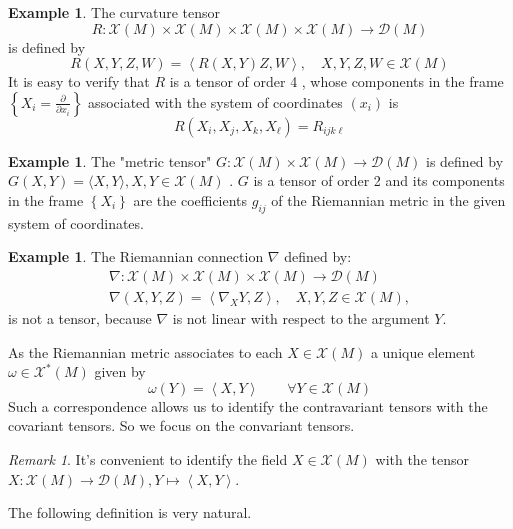 \documentclass{amsart}
\theoremstyle{plain}
\theoremstyle{definition}
\newtheorem{example}[theorem]{Example}
\theoremstyle{remark}
\newtheorem{remark}[theorem]{Remark}
\begin{document}
\begin{example}
The curvature tensor
\[
R: \mathcal{X}(M) \times \mathcal{X}(M) \times \mathcal{X}(M) \times \mathcal{X}(M) \rightarrow \mathcal{D}(M)
\]is defined by
\[
R(X, Y, Z, W)=\left< R(X, Y) Z, W\right>, \quad X, Y, Z, W \in \mathcal{X}(M)
\]It is easy to verify that $R$ is a tensor of order 4 , whose components in the frame $\left\{X_i=\frac{\partial}{\partial x_i}\right\}$ associated with the system of coordinates $\left(x_i\right)$ is
\[
R\left(X_i, X_j, X_k, X_{\ell}\right)=R_{i j k \ell}
\]
\end{example}
\begin{example}
The "metric tensor" $G: \mathcal{X}(M) \times \mathcal{X}(M) \rightarrow \mathcal{D}(M)$ is defined by $G (X, Y)=\langle X, Y\rangle, X, Y \in \mathcal{X}(M)$ .
$G$ is a tensor of order 2 and its components in the frame $\left\{X_i\right\}$ are the coefficients $g_{i j}$ of the Riemannian metric in the given system of coordinates.
\end{example}
\begin{example}
The Riemannian connection $\nabla$ defined by:
\[
\begin{gathered}
\nabla: \mathcal{X}(M) \times \mathcal{X}(M) \times \mathcal{X}(M) \rightarrow \mathcal{D}(M) \\
\nabla(X, Y, Z)=\left<\nabla_X Y, Z\right>, \quad X, Y, Z \in \mathcal{X}(M),
\end{gathered}
\]is not a tensor, because $\nabla$ is not linear with respect to the argument $Y$.
\end{example}
As the Riemannian metric associates to each $X\in \mathcal{X}(M)$ a unique element $\omega\in \mathcal{X}^{*}(M)$ given by
\[
\omega(Y)= \left< X,Y \right> \qquad \forall Y\in \mathcal{X}(M)
\]
Such a correspondence allows us to identify the contravariant tensors with the covariant tensors. So we focus on the convariant tensors.

\begin{remark}
It's convenient to identify the field $X\in \mathcal{X}(M)$ with the tensor $X:\mathcal{X}(M)\to \mathcal{D}(M),Y\mapsto\left< X,Y \right>$.\label{0c3420}
\end{remark}

The following definition is very natural.
\end{document}
